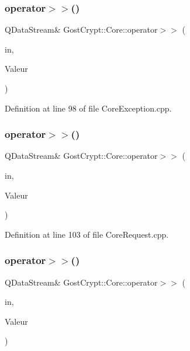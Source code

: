 \subsubsection{\texorpdfstring{operator$>$$>$()}{operator>>()}\hspace{0.1cm}{\footnotesize\ttfamily [14/56]}}
{\footnotesize\ttfamily Q\+Data\+Stream\& Gost\+Crypt\+::\+Core\+::operator$>$$>$ (\begin{DoxyParamCaption}\item[{Q\+Data\+Stream \&}]{in,  }\item[{\hyperlink{class_gost_crypt_1_1_core_1_1_failed_open_volume}{Gost\+Crypt\+::\+Core\+::\+Failed\+Open\+Volume} \&}]{Valeur }\end{DoxyParamCaption})}



Definition at line 98 of file Core\+Exception.\+cpp.

\mbox{\label{namespace_gost_crypt_1_1_core_ac259fa6bbe047267034e2fba99d2d40c}} 
\subsubsection{\texorpdfstring{operator$>$$>$()}{operator>>()}\hspace{0.1cm}{\footnotesize\ttfamily [15/56]}}
{\footnotesize\ttfamily Q\+Data\+Stream\& Gost\+Crypt\+::\+Core\+::operator$>$$>$ (\begin{DoxyParamCaption}\item[{Q\+Data\+Stream \&}]{in,  }\item[{\hyperlink{struct_gost_crypt_1_1_core_1_1_change_volume_password_request}{Change\+Volume\+Password\+Request} \&}]{Valeur }\end{DoxyParamCaption})}



Definition at line 103 of file Core\+Request.\+cpp.

\mbox{\label{namespace_gost_crypt_1_1_core_afdc228972f71299f3cc1586b98e724d4}} 
\subsubsection{\texorpdfstring{operator$>$$>$()}{operator>>()}\hspace{0.1cm}{\footnotesize\ttfamily [16/56]}}
{\footnotesize\ttfamily Q\+Data\+Stream\& Gost\+Crypt\+::\+Core\+::operator$>$$>$ (\begin{DoxyParamCaption}\item[{Q\+Data\+Stream \&}]{in,  }\item[{\hyperlink{struct_gost_crypt_1_1_core_1_1_mount_volume_response}{Mount\+Volume\+Response} \&}]{Valeur }\end{DoxyParamCaption})}



